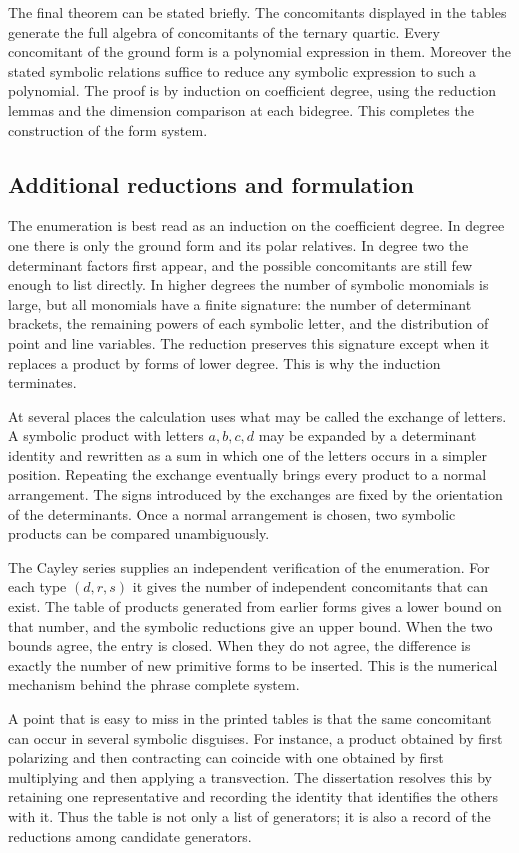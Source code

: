 \documentclass[12pt]{article}
\begin{document}
The final theorem can be stated briefly. The concomitants displayed in the tables generate the full
algebra of concomitants of the ternary quartic. Every concomitant of the ground form is a polynomial
expression in them. Moreover the stated symbolic relations suffice to reduce any symbolic expression
to such a polynomial. The proof is by induction on coefficient degree, using the reduction lemmas
and the dimension comparison at each bidegree. This completes the construction of the form system.


\subsection{Additional reductions and formulation}

The enumeration is best read as an induction on the coefficient degree. In degree one there is only
the ground form and its polar relatives. In degree two the determinant factors first appear, and the
possible concomitants are still few enough to list directly. In higher degrees the number of
symbolic monomials is large, but all monomials have a finite signature: the number of determinant
brackets, the remaining powers of each symbolic letter, and the distribution of point and line
variables. The reduction preserves this signature except when it replaces a product by forms of
lower degree. This is why the induction terminates.

At several places the calculation uses what may be called the exchange of letters. A symbolic
product with letters \(a,b,c,d\) may be expanded by a determinant identity and rewritten as a sum in
which one of the letters occurs in a simpler position. Repeating the exchange eventually brings
every product to a normal arrangement. The signs introduced by the exchanges are fixed by the
orientation of the determinants. Once a normal arrangement is chosen, two symbolic products can be
compared unambiguously.

The Cayley series supplies an independent verification of the enumeration. For each type \((d,r,s)\)
it gives the number of independent concomitants that can exist. The table of products generated from
earlier forms gives a lower bound on that number, and the symbolic reductions give an upper bound.
When the two bounds agree, the entry is closed. When they do not agree, the difference is exactly
the number of new primitive forms to be inserted. This is the numerical mechanism behind the phrase
complete system.

A point that is easy to miss in the printed tables is that the same concomitant can occur in several
symbolic disguises. For instance, a product obtained by first polarizing and then contracting can
coincide with one obtained by first multiplying and then applying a transvection. The dissertation
resolves this by retaining one representative and recording the identity that identifies the others
with it. Thus the table is not only a list of generators; it is also a record of the reductions
among candidate generators.
\end{document}
